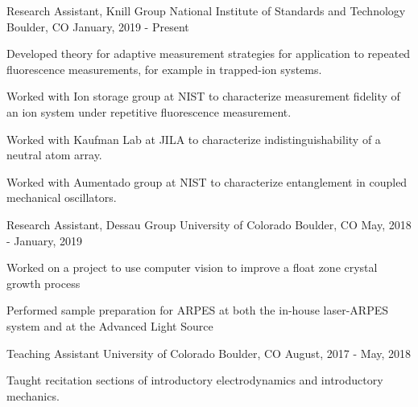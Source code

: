

\begin{cventries}

  \cventry
    {Research Assistant, Knill Group} %
    {National Institute of Standards and Technology} %
    {Boulder, CO} %
    {January, 2019 - Present} %
    {
      \begin{cvitems} %
        \item {Developed theory for adaptive measurement strategies for
          application to repeated fluorescence measurements, for example in trapped-ion systems.}
        \item {Worked with Ion storage group at NIST to characterize
          measurement fidelity of an ion system under repetitive fluorescence
        measurement.}
        \item {Worked with Kaufman Lab at JILA to characterize
          indistinguishability of a neutral atom array.}
        \item {Worked with Aumentado group at NIST to characterize entanglement
          in coupled mechanical oscillators.}
      \end{cvitems}
    }

  \cventry
    {Research Assistant, Dessau Group} %
    {University of Colorado} %
    {Boulder, CO} %
    {May, 2018 - January, 2019} %
    {
      \begin{cvitems} %
        \item {Worked on a project to use computer vision to improve a float
          zone crystal growth process}
        \item {Performed sample preparation for ARPES at both the in-house laser-ARPES system and at the Advanced Light Source}
      \end{cvitems}
    }

  \cventry
    {Teaching Assistant} %
    {University of Colorado} %
    {Boulder, CO} %
    {August, 2017 - May, 2018} %
    {
      \begin{cvitems} %
        \item {Taught recitation sections of introductory electrodynamics and
          introductory mechanics.}
      \end{cvitems}
    }


\end{cventries}
